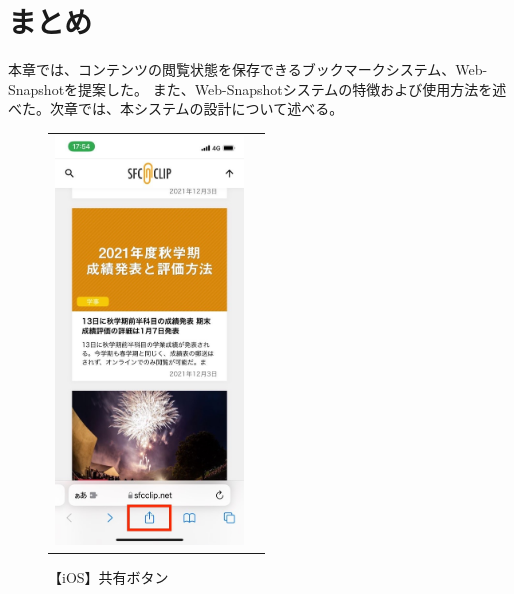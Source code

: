 \section{まとめ}
本章では、コンテンツの閲覧状態を保存できるブックマークシステム、Web-Snapshotを提案した。
また、Web-Snapshotシステムの特徴および使用方法を述べた。次章では、本システムの設計について述べる。

\begin{figure}[htbp]
  \begin{tabular}{cc}
    \begin{minipage}[t]{0.45\hsize}
      \caption{【iOS】共有ボタン}
      \label{fig:usage-ios-share}
      \begin{center}
        \includegraphics[bb=0 0 585 1266,width=5cm]{img/030_web_snapshot_system/ios/usage-ios-share.pdf}
      \end{center}
    \end{minipage} &


\end{tabular}
\end{figure}
